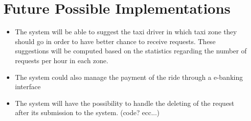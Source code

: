 \section{Future Possible Implementations}
\begin{itemize}
	\item The system will be able to suggest the taxi driver in which taxi zone they should go in order to have better chance to receive requests. These suggestions will be computed based on the statistics regarding the number of requests per hour in each zone.
	\item The system could also manage the payment of the ride through a e-banking interface
	\item The system will have the possibility to handle the deleting of the request after its submission to the system. (code? ecc...)
\end{itemize}
